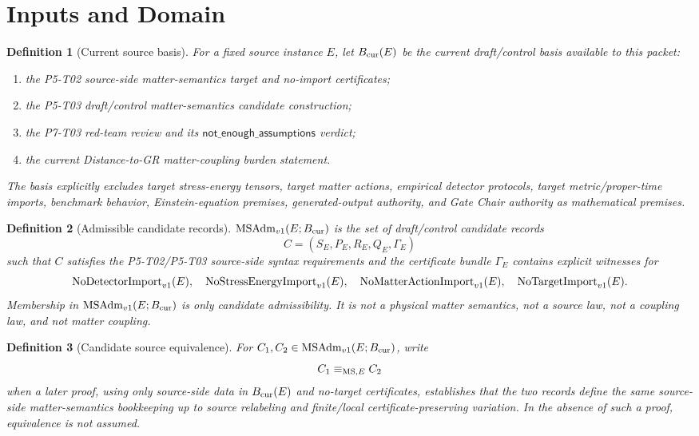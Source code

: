 \newtheorem{definition}{Definition}
\newtheorem{proposition}{Proposition}
\newtheorem{lemma}{Lemma}

\section{Inputs and Domain}

\begin{definition}[Current source basis]
For a fixed source instance \(E\), let \(B_{\mathrm{cur}}(E)\) be the current
draft/control basis available to this packet:
\begin{enumerate}
  \item the P5-T02 source-side matter-semantics target and no-import
    certificates;
  \item the P5-T03 draft/control matter-semantics candidate construction;
  \item the P7-T03 red-team review and its
    \(\mathsf{not\_enough\_assumptions}\) verdict;
  \item the current Distance-to-GR matter-coupling burden statement.
\end{enumerate}
The basis explicitly excludes target stress-energy tensors, target matter
actions, empirical detector protocols, target metric/proper-time imports,
benchmark behavior, Einstein-equation premises, generated-output authority,
and Gate Chair authority as mathematical premises.
\end{definition}

\begin{definition}[Admissible candidate records]
\(\mathrm{MSAdm}_{v1}(E;B_{\mathrm{cur}})\) is the set of draft/control candidate records
\[
  C=(S_E,P_E,R_E,Q_E,\Gamma_E)
\]
such that \(C\) satisfies the P5-T02/P5-T03 source-side syntax requirements
and the certificate bundle \(\Gamma_E\) contains explicit witnesses for
\[
  \mathrm{NoDetectorImport}_{v1}(E),\quad \mathrm{NoStressEnergyImport}_{v1}(E),\quad \mathrm{NoMatterActionImport}_{v1}(E),\quad \mathrm{NoTargetImport}_{v1}(E).
\]
Membership in \(\mathrm{MSAdm}_{v1}(E;B_{\mathrm{cur}})\) is only candidate admissibility.  It is not
a physical matter semantics, not a source law, not a coupling law, and not
matter coupling.
\end{definition}

\begin{definition}[Candidate source equivalence]
For \(C_1,C_2\in\mathrm{MSAdm}_{v1}(E;B_{\mathrm{cur}})\), write
\[
  C_1 \equiv_{\mathrm{MS},E} C_2
\]
when a later proof, using only source-side data in \(B_{\mathrm{cur}}(E)\) and no-target
certificates, establishes that the two records define the same source-side
matter-semantics bookkeeping up to source relabeling and finite/local
certificate-preserving variation.  In the absence of such a proof, equivalence
is not assumed.
\end{definition}

